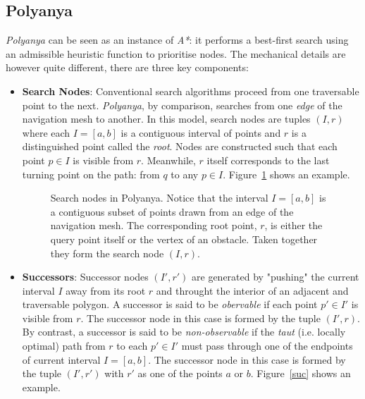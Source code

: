 \subsection{Polyanya}
\textit{Polyanya} can be seen as an instance of \textit{A*}: it performs a best-first search
using an admissible heuristic function to prioritise nodes. The mechanical details are however
quite different, there are three key components:
\begin{itemize}
\item \textbf{Search Nodes}: Conventional  search algorithms proceed from one traversable point
  to the next. \textit{Polyanya}, by comparison, searches from one \textit{edge} of the
  navigation mesh to another. In this model, search nodes are tuples $(I, r)$ where each
  $I=[a,b]$ is a contiguous interval of points and $r$ is a distinguished point called the
  \textit{root}. Nodes are constructed such that each point $p \in I$ is visible from $r$.
  Meanwhile, $r$ itself corresponds to the last turning point on the path: from $q$ to any $p
  \in I$. Figure~\ref{snode} shows an example.

  \begin{figure}[htb]
    \centering
    
    \caption{\small Search nodes in Polyanya. Notice that the interval $I = [a, b]$ is
    a contiguous subset of points drawn from an edge of the navigation mesh.
    The corresponding root point, $r$, is either the query point itself 
    or the vertex of an obstacle. Taken together they form the search node $(I, r)$.}
    \label{snode}
  \end{figure}

\item \textbf{Successors}: Successor nodes $(I', r')$ are generated by "pushing" the current
  interval $I$ away from its root $r$ and throught the interior of an adjacent and traversable
  polygon. A successor is said to be \textit{obervable} if each point $p' \in I'$ is visible
  from $r$. The successor node in this case is formed by the tuple $(I',r)$. By contrast, a
  successor is said to be \textit{non-observable} if the \textit{taut} (i.e. locally optimal)
  path from $r$ to each $p' \in I'$ must pass through one of the endpoints of current interval
  $I=[a,b]$. The successor node in this case is formed by the tuple $(I', r')$ with $r'$ as
  one of the points $a$ or $b$. Figure~\ref{suc} shows an example.
 

\end{itemize}
